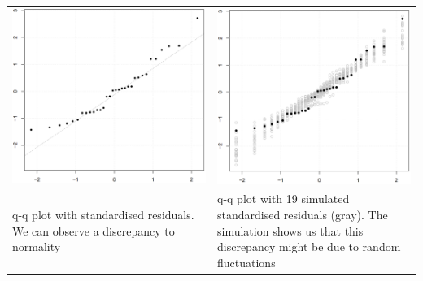 \begin{table}[H]
  \setlength{\tabcolsep}{0.2em}
  \scriptsize
  \begin{tabular}{p{}@{\hskip 1em}p{}}
    \includegraphics[width=\linewidth]{Pics/8.2.10.png}& \includegraphics[width=\linewidth]{Pics/8.2.11.png} \\
    q-q plot with standardised residuals. We can observe a discrepancy to normality &
    q-q plot with 19 simulated standardised residuals (gray). The simulation shows us that this discrepancy might be due to random fluctuations\\
  \end{tabular}
\end{table}

